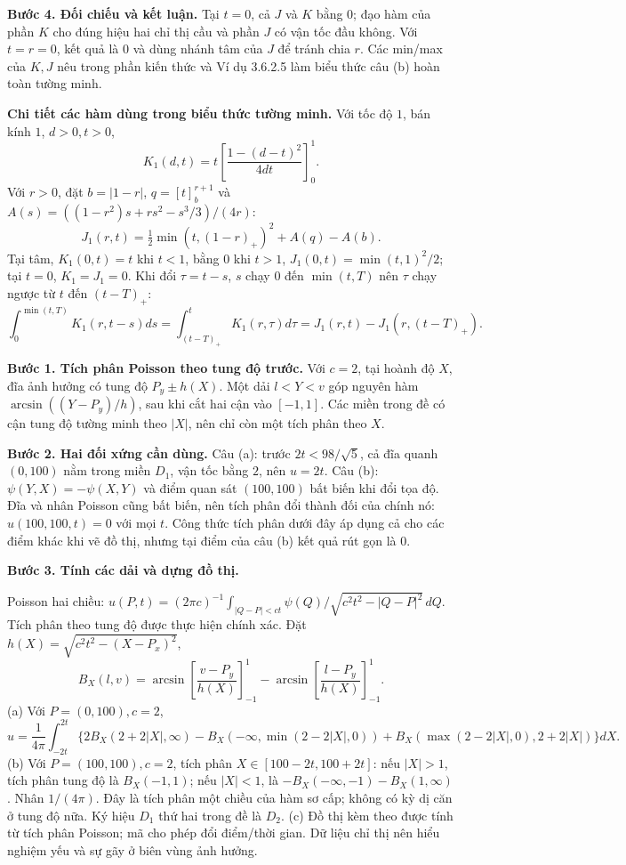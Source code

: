 \textbf{Bước 4. Đối chiếu và kết luận.} Tại $t=0$, cả $J$ và $K$ bằng $0$; đạo hàm của phần $K$ cho đúng hiệu hai chỉ thị cầu và phần $J$ có vận tốc đầu không. Với $t=r=0$, kết quả là $0$ và dùng nhánh tâm của $J$ để tránh chia $r$. Các min/max của $K,J$ nêu trong phần kiến thức và Ví dụ 3.6.2.5 làm biểu thức câu (b) hoàn toàn tường minh.

\textbf{Chi tiết các hàm dùng trong biểu thức tường minh.} Với tốc độ $1$, bán kính $1$, $d>0,t>0$,
\[K_1(d,t)=t\left[\frac{1-(d-t)^2}{4dt}\right]_0^1.\]
Với $r>0$, đặt $b=|1-r|$, $q=[t]_b^{r+1}$ và $A(s)=((1-r^2)s+rs^2-s^3/3)/(4r)$:
\[J_1(r,t)=\tfrac12\min(t,(1-r)_+)^2+A(q)-A(b).\]
Tại tâm, $K_1(0,t)=t$ khi $t<1$, bằng $0$ khi $t>1$, $J_1(0,t)=\min(t,1)^2/2$; tại $t=0$, $K_1=J_1=0$. Khi đổi $\tau=t-s$, $s$ chạy $0$ đến $\min(t,T)$ nên $\tau$ chạy ngược từ $t$ đến $(t-T)_+$:
\[\int_0^{\min(t,T)}K_1(r,t-s)ds=\int_{(t-T)_+}^{t}K_1(r,\tau)d\tau=J_1(r,t)-J_1(r,(t-T)_+).\]

\textbf{Bước 1. Tích phân Poisson theo tung độ trước.} Với $c=2$, tại hoành độ $X$, đĩa ảnh hưởng có tung độ $P_y\pm h(X)$. Một dải $l<Y<v$ góp nguyên hàm $\arcsin((Y-P_y)/h)$, sau khi cắt hai cận vào $[-1,1]$. Các miền trong đề có cận tung độ tường minh theo $|X|$, nên chỉ còn một tích phân theo $X$.

\textbf{Bước 2. Hai đối xứng cần dùng.} Câu (a): trước $2t<98/\sqrt5$, cả đĩa quanh $(0,100)$ nằm trong miền $D_1$, vận tốc bằng $2$, nên $u=2t$. Câu (b): $\psi(Y,X)=-\psi(X,Y)$ và điểm quan sát $(100,100)$ bất biến khi đổi tọa độ. Đĩa và nhân Poisson cũng bất biến, nên tích phân đổi thành đối của chính nó: $u(100,100,t)=0$ với mọi $t$. Công thức tích phân dưới đây áp dụng cả cho các điểm khác khi vẽ đồ thị, nhưng tại điểm của câu (b) kết quả rút gọn là $0$.

\textbf{Bước 3. Tính các dải và dựng đồ thị.}

Poisson hai chiều: $u(P,t)=(2\pi c)^{-1}\int_{|Q-P|<ct}\psi(Q)/\sqrt{c^2t^2-|Q-P|^2}\,dQ$. Tích phân theo tung độ được thực hiện chính xác. Đặt $h(X)=\sqrt{c^2t^2-(X-P_x)^2}$,
\[B_X(l,v)=\arcsin\left[\frac{v-P_y}{h(X)}\right]_{-1}^1-\arcsin\left[\frac{l-P_y}{h(X)}\right]_{-1}^1.\]
(a) Với $P=(0,100),c=2$,
\[u=\frac1{4\pi}\int_{-2t}^{2t}\{2B_X(2+2|X|,\infty)-B_X(-\infty,\min(2-2|X|,0))+B_X(\max(2-2|X|,0),2+2|X|)\}dX.\]
(b) Với $P=(100,100),c=2$, tích phân $X\in[100-2t,100+2t]$: nếu $|X|>1$, tích phân tung độ là $B_X(-1,1)$; nếu $|X|<1$, là $-B_X(-\infty,-1)-B_X(1,\infty)$. Nhân $1/(4\pi)$. Đây là tích phân một chiều của hàm sơ cấp; không có kỳ dị căn ở tung độ nữa. Ký hiệu $D_1$ thứ hai trong đề là $D_2$.
(c) Đồ thị kèm theo được tính từ tích phân Poisson; mã cho phép đổi điểm/thời gian. Dữ liệu chỉ thị nên hiểu nghiệm yếu và sự gãy ở biên vùng ảnh hưởng.

